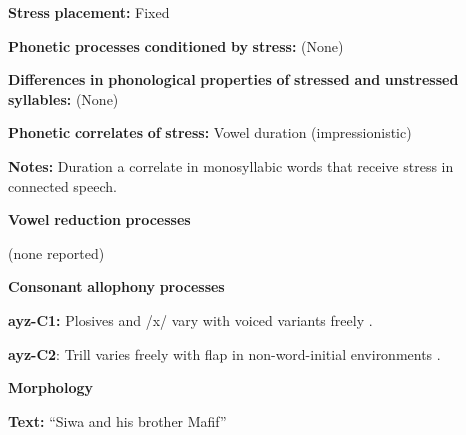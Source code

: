 \begin{styleBody}
\textbf{Stress} \textbf{placement:} Fixed
\end{styleBody}

\begin{styleBody}
\textbf{Phonetic} \textbf{processes} \textbf{conditioned} \textbf{by} \textbf{stress:} (None)
\end{styleBody}

\begin{styleBody}
\textbf{Differences} \textbf{in} \textbf{phonological} \textbf{properties} \textbf{of} \textbf{stressed} \textbf{and} \textbf{unstressed} \textbf{syllables:} (None)
\end{styleBody}

\begin{styleBody}
\textbf{Phonetic} \textbf{correlates} \textbf{of} \textbf{stress:} Vowel duration (impressionistic)
\end{styleBody}

\begin{styleBody}
\textbf{Notes:} Duration a correlate in monosyllabic words that receive stress in connected speech.
\end{styleBody}

\begin{styleBody}
\textbf{Vowel} \textbf{reduction} \textbf{processes}
\end{styleBody}

\begin{styleBody}
(none reported)
\end{styleBody}

\begin{styleBody}
\textbf{Consonant} \textbf{allophony} \textbf{processes}
\end{styleBody}

\begin{styleBody}
\textbf{ayz-C1:} Plosives and /x/ vary with voiced variants freely \citep[21-2]{Dol2007}.
\end{styleBody}

\begin{styleBody}
\textbf{ayz-C2}: Trill varies freely with flap in non-word-initial environments \citep[24]{Dol2007}.
\end{styleBody}

\begin{styleBody}
\textbf{Morphology}
\end{styleBody}

\begin{styleBody}
\textbf{Text:} “Siwa and his brother Mafif” \citep[284-291]{Dol2007}
\end{styleBody}

